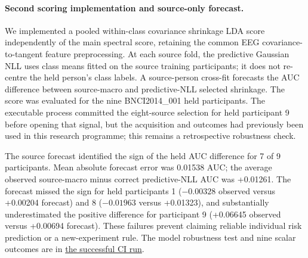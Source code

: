 \paragraph{Second scoring implementation and source-only forecast.}
We implemented a pooled within-class covariance shrinkage LDA score
independently of the main spectral score, retaining the common EEG
covariance-to-tangent feature preprocessing. At each source fold,
the predictive Gaussian NLL uses class means fitted on the source
training participants; it does not re-centre the held person's class
labels. A source-person cross-fit forecasts the AUC difference
between source-macro and predictive-NLL selected shrinkage. The
score was evaluated for the nine BNCI2014\_001 held participants.
The executable process committed the eight-source selection for
held participant 9 before opening that signal, but the acquisition
and outcomes had previously been used in this research programme;
this remains a retrospective robustness check.

The source forecast identified the sign of the held AUC difference
for 7 of 9 participants. Mean absolute forecast error was
0.01538 AUC; the average observed source-macro minus correct
predictive-NLL AUC was +0.01261. The forecast missed the sign for
held participants 1 ($-0.00328$ observed versus +0.00204 forecast)
and 8 ($-0.01963$ versus +0.01323), and substantially underestimated
the positive difference for participant 9 (+0.06645 observed versus
+0.00694 forecast). These failures prevent claiming reliable
individual risk prediction or a new-experiment rule. The model
robustness test and nine scalar outcomes are in
\href{https://github.com/lindicaphxag-tech/kaggle/actions/runs/38363352983}{the successful CI run}.
